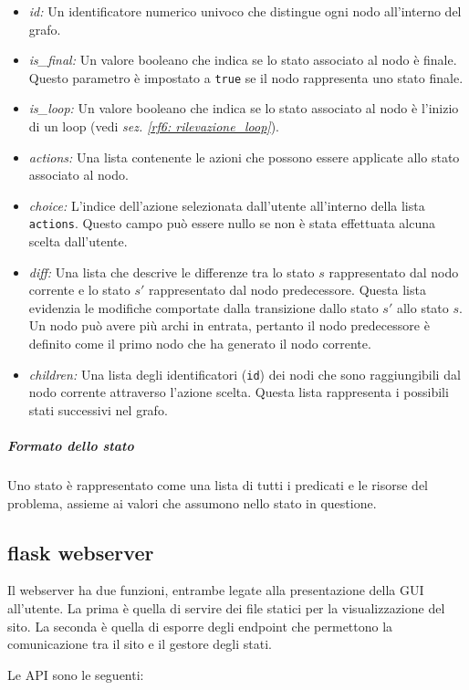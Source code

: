 \documentclass[a4paper, 11pt, titlepage, twoside, openany]{book}
\begin{document}
\begin{itemize}
    \item \textit{id:} Un identificatore numerico univoco che distingue ogni nodo all'interno del grafo.
    \item \textit{is\_final:} Un valore booleano che indica se lo stato associato al nodo è finale. Questo parametro è impostato a \texttt{true} se il nodo rappresenta uno stato finale.
    \item \textit{is\_loop:} Un valore booleano che indica se lo stato associato al nodo è l'inizio di un loop (vedi \textit{sez. \ref{rf6: rilevazione_loop}}).
    \item \textit{actions:} Una lista contenente le azioni che possono essere applicate allo stato associato al nodo.
    \item \textit{choice:} L'indice dell'azione selezionata dall'utente all'interno della lista \texttt{actions}. Questo campo può essere nullo se non è stata effettuata alcuna scelta dall'utente.
    \item \textit{diff:} Una lista che descrive le differenze tra lo stato $s$ rappresentato dal nodo corrente e lo stato $s'$ rappresentato dal nodo predecessore. Questa lista evidenzia le modifiche comportate dalla transizione dallo stato $s'$ allo stato $s$. Un nodo può avere più archi in entrata, pertanto il nodo predecessore è definito come il primo nodo che ha generato il nodo corrente.
    \item \textit{children:} Una lista degli identificatori (\texttt{id}) dei nodi che sono raggiungibili dal nodo corrente attraverso l'azione scelta. Questa lista rappresenta i possibili stati successivi nel grafo.
\end{itemize}

\subparagraph{Formato dello stato}
Uno stato è rappresentato come una lista di tutti i predicati e le risorse del problema, assieme ai valori che assumono nello stato in questione.

\subsection{flask webserver}
\label{subsec: webserver}
Il webserver ha due funzioni, entrambe legate alla presentazione della GUI all'utente. La prima è quella di servire dei file statici per la visualizzazione del sito. La seconda è quella di esporre degli endpoint che permettono la comunicazione tra il sito e il gestore degli stati.

Le API sono le seguenti:
\end{document}
